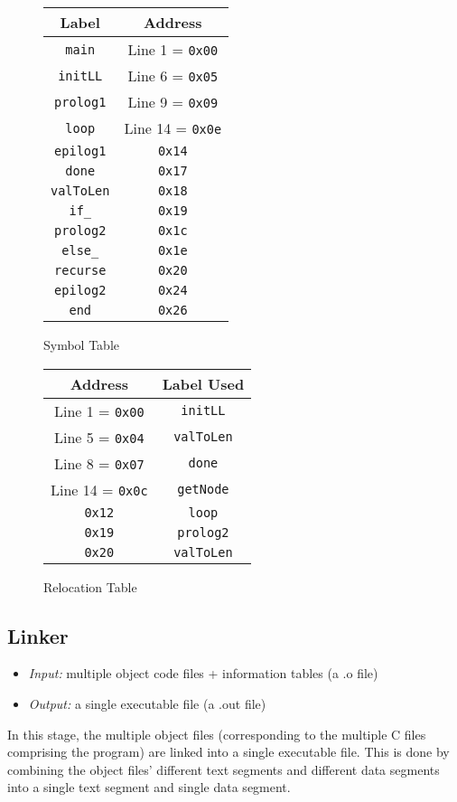 \documentclass{article}
\begin{document}
\begin{figure}
\centering
\begin{minipage}{0.4\textwidth}
 \begin{tabular}{||c c||} 
 \hline
 \textbf{Label} & \textbf{Address}\\
 \hline
 \texttt{main} & Line 1 = \texttt{0x00}\\ 
 \texttt{initLL} & Line 6 = \texttt{0x05} \\
 \texttt{prolog1} & Line 9 = \texttt{0x09}\\ 
 \texttt{loop} & Line 14 = \texttt{0x0e}\\ 
 \texttt{epilog1} & \texttt{0x14}\\ 
 \texttt{done} & \texttt{0x17}\\ 
 \texttt{valToLen} & \texttt{0x18}\\ 
 \texttt{if\_} & \texttt{0x19}\\ 
 \texttt{prolog2} & \texttt{0x1c}\\ 
 \texttt{else\_} & \texttt{0x1e}\\ 
 \texttt{recurse} & \texttt{0x20}\\ 
 \texttt{epilog2} & \texttt{0x24}\\ 
 \texttt{end} & \texttt{0x26}\\    
 \hline
\end{tabular}
\caption{Symbol Table}
\vfill
\end{minipage}\hfill
%
\begin{minipage}{0.4\textwidth}
\raggedright
 \begin{tabular}{||c c||} 
 \hline
 \textbf{Address} & \textbf{Label Used}\\
 \hline
Line 1 = \texttt{0x00} & \texttt{initLL}\\ 
Line 5 = \texttt{0x04} & \texttt{valToLen}\\  
Line 8 = \texttt{0x07} & \texttt{done}\\ 
Line 14 = \texttt{0x0c} & \texttt{getNode}\\ 
\texttt{0x12} & \texttt{loop}\\ 
\texttt{0x19} & \texttt{prolog2}\\
\texttt{0x20} & \texttt{valToLen}\\  
 \hline
\end{tabular}
\caption{Relocation Table}
\end{minipage}
%

\end{figure}
\newpage
\subsection{Linker}
\begin{itemize}
\item \textit{Input:} multiple object code files + information tables (a .o file)
\item \textit{Output:} a single executable file (a .out file)
\end{itemize}
In this stage, the multiple object files (corresponding to the multiple C files comprising the program) are linked into a single executable file. This is done by combining the object files' different text segments and different data segments into a single text segment and single data segment. 
\end{document}
